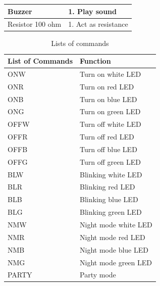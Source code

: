 \begin{table}[]
\begin{center}
\begin{tabular}{|l|l|}
Buzzer                                                                     & 1. Play sound                                                                                                                                                              \\ \hline
Resistor 100 ohm                                                           & 1. Act as resistance                                                                                                                                                       \\ \hline
\end{tabular}
\end{center}
\end{table}















\begin{table}[]
\begin{center}
\caption{Lists of commands}
\begin{tabular}{|l|l|}
\hline
List of Commands & Function             \\ \hline
ONW              & Turn on white LED    \\ \hline
ONR              & Turn on red LED      \\ \hline
ONB              & Turn on blue LED     \\ \hline
ONG              & Turn on green LED    \\ \hline
OFFW             & Turn off white LED   \\ \hline
OFFR             & Turn off red LED     \\ \hline
OFFB             & Turn off blue LED    \\ \hline
OFFG             & Turn off green LED   \\ \hline
BLW              & Blinking white LED   \\ \hline
BLR              & Blinking red LED     \\ \hline
BLB              & Blinking blue LED    \\ \hline
BLG              & Blinking green LED   \\ \hline
NMW              & Night mode white LED \\ \hline
NMR              & Night mode red LED   \\ \hline
NMB              & Night mode blue LED  \\ \hline
NMG              & Night mode green LED \\ \hline
PARTY            & Party mode           \\ \hline
\end{tabular}
\end{center}
\end{table}


